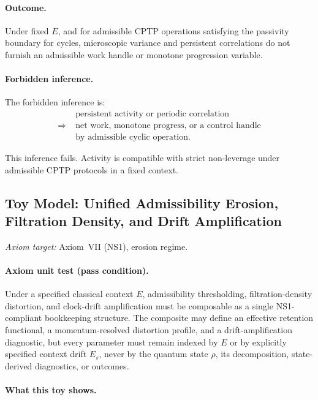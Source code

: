 \documentclass[aps,prx,onecolumn,11pt]{revtex4-2}
\theoremstyle{plain}
\theoremstyle{definition}
\theoremstyle{remark}
\begin{document}
\paragraph{Outcome.}

Under fixed \(E\), and for admissible CPTP operations satisfying the
passivity boundary for cycles, microscopic variance and persistent
correlations do not furnish an admissible work handle or monotone
progression variable.

\paragraph{Forbidden inference.}

The forbidden inference is:
\[
\begin{aligned}
&\text{persistent activity or periodic correlation}
\\
\Longrightarrow\;
&\text{net work, monotone progress, or a control handle}
\\
&\text{by admissible cyclic operation}.
\end{aligned}
\]

This inference fails. Activity is compatible with strict non-leverage
under admissible CPTP protocols in a fixed context.

\subsection{Toy Model: Unified Admissibility Erosion, Filtration Density, and Drift Amplification}
\label{toy:unified_admissibility_erosion}

\noindent\emph{Axiom target:} Axiom~VII (NS1), erosion regime.

\paragraph{Axiom unit test (pass condition).}

Under a specified classical context \(E\), admissibility thresholding,
filtration-density distortion, and clock-drift amplification must be
composable as a single NS1-compliant bookkeeping structure. The
composite may define an effective retention functional, a
momentum-resolved distortion profile, and a drift-amplification
diagnostic, but every parameter must remain indexed by \(E\) or by
explicitly specified context drift \(E_s\), never by the quantum state
\(\rho\), its decomposition, state-derived diagnostics, or outcomes.

\paragraph{What this toy shows.}
\end{document}
